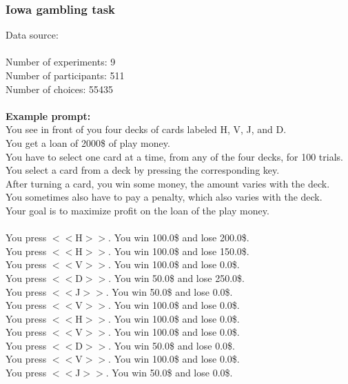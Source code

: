 \documentclass[pdflatex,sn-nature]{sn-jnl}%
\theoremstyle{thmstyleone}%
\theoremstyle{thmstyletwo}%
\theoremstyle{thmstylethree}%
\begin{document}
\subsubsection*{Iowa gambling task}
Data source: \cite{steingroever2015data} \\ $~$ \\
Number of experiments: 9 $~$\\ 
Number of participants: 511 $~$\\ 
Number of choices: 55435 $~$\\ 
 $~$\\ 
\textbf{Example prompt:}
 $~$\\ 
You see in front of you four decks of cards labeled H, V, J, and D. $~$\\ 
You get a loan of 2000\$ of play money. $~$\\ 
You have to select one card at a time, from any of the four decks, for 100 trials. $~$\\ 
You select a card from a deck by pressing the corresponding key. $~$\\ 
After turning a card, you win some money, the amount varies with the deck. $~$\\ 
You sometimes also have to pay a penalty, which also varies with the deck. $~$\\ 
Your goal is to maximize profit on the loan of the play money. $~$\\ 
 $~$\\ 
You press $<<$H$>>$. You win 100.0\$ and lose 200.0\$. $~$\\ 
You press $<<$H$>>$. You win 100.0\$ and lose 150.0\$. $~$\\ 
You press $<<$V$>>$. You win 100.0\$ and lose 0.0\$. $~$\\ 
You press $<<$D$>>$. You win 50.0\$ and lose 250.0\$. $~$\\ 
You press $<<$J$>>$. You win 50.0\$ and lose 0.0\$. $~$\\ 
You press $<<$V$>>$. You win 100.0\$ and lose 0.0\$. $~$\\ 
You press $<<$H$>>$. You win 100.0\$ and lose 0.0\$. $~$\\ 
You press $<<$V$>>$. You win 100.0\$ and lose 0.0\$. $~$\\ 
You press $<<$D$>>$. You win 50.0\$ and lose 0.0\$. $~$\\ 
You press $<<$V$>>$. You win 100.0\$ and lose 0.0\$. $~$\\ 
You press $<<$J$>>$. You win 50.0\$ and lose 0.0\$. $~$\\ 
\end{document}
